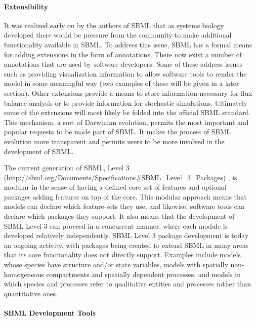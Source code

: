 \paragraph{Extensibility}

It was realized early on by the authors of SBML that as systems biology
developed there would be pressure from the community to make additional
functionality available in SBML. To address this issue, SBML has a
formal means for adding extensions in the form of annotations. There now
exist a number of annotations that are used by software developers. Some
of these address issues such as providing visualization information to
allow software tools to render the model in some meaningful way (two
examples of these will be given in a later section). Other extensions
provide a means to store information necessary for flux balance analysis
or to provide information for stochastic simulations. Ultimately some of
the extensions will most likely be folded into the official SBML
standard. This mechanism, a sort of Darwinian evolution, permits the
most important and popular requests to be made part of SBML. It makes
the process of SBML evolution more transparent and permits users to be
more involved in the development of SBML.

The current generation of SBML, Level 3
(\url{http://sbml.org/Documents/Specifications#SBML_Level_3_Packages})
\autocite{hucka2010systems}, is modular in the sense of having a defined
core set of features and optional packages adding features on top of the
core. This modular approach means that models can declare which
feature-sets they use, and likewise, software tools can declare which
packages they support. It also means that the development of SBML Level
3 can proceed in a concurrent manner, where each module is developed
relatively independently. SBML Level 3 package development is today an
ongoing activity, with packages being created to extend SBML in many
areas that its core functionality does not directly support. Examples
include models whose species have structure and/or state variables,
models with spatially non-homogeneous compartments and spatially
dependent processes, and models in which species and processes refer to
qualitative entities and processes rather than quantitative ones.

\paragraph{SBML Development Tools \label{libsbml}}

